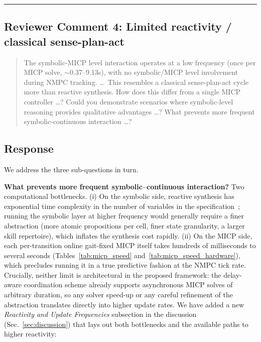 \noindent\rule{17cm}{2.0pt}

\subsection{Reviewer Comment 4: Limited reactivity / classical sense-plan-act}
\begin{mdframed}
\begin{quote}
The symbolic-MICP level interaction operates at a low frequency (once per MICP solve, $\sim$0.37--9.13s), with no symbolic/MICP level involvement during NMPC tracking. \ldots\ This resembles a classical sense-plan-act cycle more than reactive synthesis. How does this differ from a single MICP controller \ldots ? Could you demonstrate scenarios where symbolic-level reasoning provides qualitative advantages \ldots ? What prevents more frequent symbolic-continuous interaction \ldots ?
\end{quote}
\end{mdframed}

\subsection{Response}
We address the three sub-questions in turn.

\noindent \textbf{What prevents more frequent symbolic--continuous interaction?} Two computational bottlenecks. (i) On the symbolic side, reactive synthesis has exponential time complexity in the number of variables in the specification~\citep{bloem2012synthesis}; running the symbolic layer at higher frequency would generally require a finer abstraction (more atomic propositions per cell, finer state granularity, a larger skill repertoire), which inflates the synthesis cost rapidly. (ii) On the MICP side, each per-transition online gait-fixed MICP itself takes hundreds of milliseconds to several seconds (Tables~\ref{tab:micp_speed} and~\ref{tab:micp_speed_hardware}), which precludes running it in a true predictive fashion at the NMPC tick rate. Crucially, neither limit is architectural in the proposed framework: the delay-aware coordination scheme already supports asynchronous MICP solves of arbitrary duration, so any solver speed-up or any careful refinement of the abstraction translates directly into higher update rates. We have added a new \textit{Reactivity and Update Frequencies} subsection in the discussion (Sec.~\ref{sec:discussion}) that lays out both bottlenecks and the available paths to higher reactivity:

\textit{}

